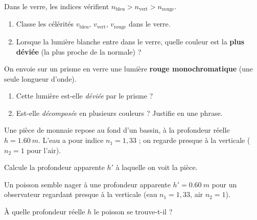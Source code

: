\documentclass[11pt,a4paper]{article}
\begin{document}
\begin{exo}
Dans le verre, les indices vérifient $n_{\text{bleu}}>n_{\text{vert}}>n_{\text{rouge}}$.
\begin{enumerate}[label=\alph*)]
  \item Classe les célérités $v_{\text{bleu}}$, $v_{\text{vert}}$, $v_{\text{rouge}}$ dans le verre.
  \item Lorsque la lumière blanche entre dans le verre, quelle couleur est la \textbf{plus déviée}
        (la plus proche de la normale) ?
\end{enumerate}
\end{exo}

\begin{exo}
On envoie sur un prisme en verre une lumière \textbf{rouge monochromatique} (une seule longueur d'onde).
\begin{enumerate}[label=\alph*)]
  \item Cette lumière est-elle \emph{déviée} par le prisme ?
  \item Est-elle \emph{décomposée} en plusieurs couleurs ? Justifie en une phrase.
\end{enumerate}
\end{exo}

\begin{exo}
Une pièce de monnaie repose au fond d'un bassin, à la profondeur réelle $h=\qty{1.60}{m}$. L'eau a
pour indice $n_1=1{,}33$ ; on regarde presque à la verticale ($n_2=1$ pour l'air).

Calcule la profondeur apparente $h'$ à laquelle on voit la pièce.
\end{exo}

\begin{exo}
Un poisson semble nager à une profondeur apparente $h'=\qty{0.60}{m}$ pour un observateur regardant
presque à la verticale (eau $n_1=1{,}33$, air $n_2=1$).

À quelle profondeur réelle $h$ le poisson se trouve-t-il ?
\end{exo}
\end{document}
